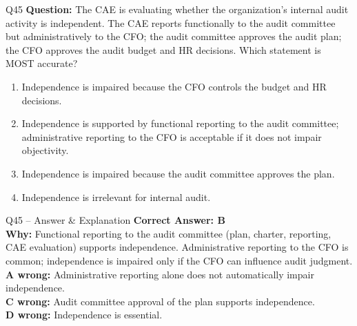 \documentclass[aspectratio=169,10pt]{beamer}
\begin{document}
	\begin{frame}[t]{Q45}
		\small
		\textbf{Question:} The CAE is evaluating whether the organization's internal audit activity is independent. The CAE reports functionally to the audit committee but administratively to the CFO; the audit committee approves the audit plan; the CFO approves the audit budget and HR decisions. Which statement is MOST accurate?
		\begin{enumerate}[label=\Alph*.,itemsep=1pt,topsep=2pt]
			\item Independence is impaired because the CFO controls the budget and HR decisions.
			\item Independence is supported by functional reporting to the audit committee; administrative reporting to the CFO is acceptable if it does not impair objectivity.
			\item Independence is impaired because the audit committee approves the plan.
			\item Independence is irrelevant for internal audit.
		\end{enumerate}
	\end{frame}
	
	\begin{frame}[t]{Q45 -- Answer \& Explanation}
		\small
		\textbf{Correct Answer: B} \\[4pt]
		\textbf{Why:} Functional reporting to the audit committee (plan, charter, reporting, CAE evaluation) supports independence. Administrative reporting to the CFO is common; independence is impaired only if the CFO can influence audit judgment. \\[4pt]
		\textbf{A wrong:} Administrative reporting alone does not automatically impair independence. \\[2pt]
		\textbf{C wrong:} Audit committee approval of the plan supports independence. \\[2pt]
		\textbf{D wrong:} Independence is essential.
	\end{frame}
	
\end{document}
